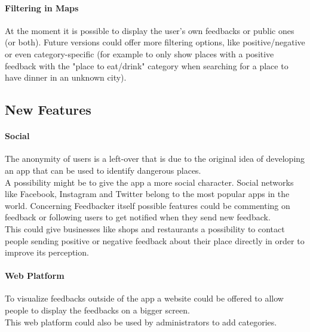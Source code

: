 \paragraph{Filtering in Maps}
At the moment it is possible to display the user's own feedbacks or public ones (or both). Future versions could offer more filtering options, like positive/negative or even category-specific (for example to only show places with a positive feedback with the "place to eat/drink" category when searching for a place to have dinner in an unknown city).


\subsection{New Features}
\paragraph{Social}
The anonymity of users is a left-over that is due to the original idea of developing an app that can be used to identify dangerous places.\\
A possibility might be to give the app a more social character. Social networks like Facebook, Instagram and Twitter belong to the most popular apps in the world. Concerning Feedbacker itself possible features could be commenting on feedback or following users to get notified when they send new feedback.\\
This could give businesses like shops and restaurants a possibility to contact people sending positive or negative feedback about their place directly in order to improve its perception.
\paragraph{Web Platform}
To visualize feedbacks outside of the app a website could be offered to allow people to display the feedbacks on a bigger screen.\\
This web platform could also be used by administrators to add categories.
